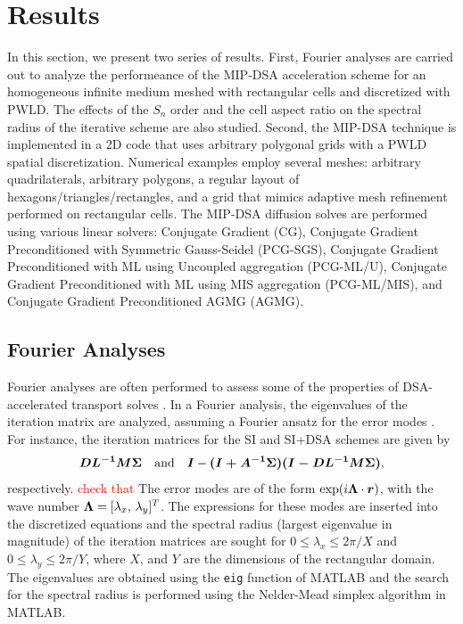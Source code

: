\section{Results} \label{sec_res}

In this section, we present two series of results. First, Fourier analyses are 
carried out to analyze the performeance of the MIP-DSA acceleration scheme 
for an homogeneous infinite medium meshed with rectangular cells and discretized with PWLD.
The effects of the $S_n$ order and the cell aspect ratio on the spectral radius of the iterative 
scheme are also studied. Second, the MIP-DSA technique is implemented in a 2D \sn code that uses
arbitrary polygonal grids with a PWLD spatial discretization.  Numerical examples employ
several meshes: arbitrary quadrilaterals, arbitrary polygons, a regular layout of 
hexagons/triangles/rectangles, and a grid that mimics adaptive mesh refinement 
performed on rectangular cells. The MIP-DSA diffusion solves are performed using various
linear solvers: Conjugate Gradient (CG), Conjugate Gradient
Preconditioned with Symmetric Gauss-Seidel (PCG-SGS), Conjugate Gradient
Preconditioned with ML using Uncoupled aggregation (PCG-ML/U),
Conjugate Gradient Preconditioned with ML using MIS aggregation (PCG-ML/MIS),
and Conjugate Gradient Preconditioned AGMG (AGMG). 

\subsection{Fourier Analyses}

Fourier analyses are often performed to assess some of the properties of 
DSA-accelerated transport solves \cite{larsen_dsa,consistent_p1,more}. In a Fourier analysis,
the eigenvalues of the iteration matrix are analyzed, assuming a Fourier ansatz for the 
error modes \cite{}. For instance, the iteration matrices for the SI and SI+DSA schemes are given by
\begin{equation}
\boldsymbol{D L^{-1}M \Sigma} \quad \text{and} \quad \boldsymbol{I}-\boldsymbol{(I+A^{-1}\Sigma)(I-D L^{-1}M \Sigma)},
\end{equation}
respectively. \textcolor{red}{check that} The error modes are of the form $\exp(i \boldsymbol{\Lambda} \cdot \boldsymbol{r})$, with the
wave number $\boldsymbol{\Lambda}=[\lambda_x,\, \lambda_y]^T$. The expressions for these modes 
are inserted into the discretized equations and the spectral radius (largest eigenvalue in magnitude)
of the iteration matrices are sought for $0 \le \lambda_x \le 2\pi/X$ and $0 \le \lambda_y \le 2\pi/Y$,
where $X$, and $Y$ are the dimensions of the rectangular domain. The eigenvalues are obtained
using the {\tt eig} function of MATLAB and the search for the spectral radius is performed
using the Nelder-Mead simplex algorithm in MATLAB.


